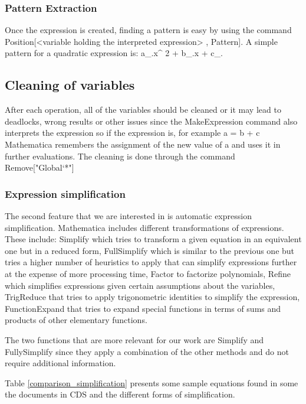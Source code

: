 \subsubsection{Pattern Extraction}
Once the expression is created, finding a pattern is easy by using the command {\codefont Position[<variable holding the interpreted expression> , Pattern]}. A simple pattern for a quadratic expression is: {\codefont a\_.x\^{} 2 + b\_.x + c\_.}

\subsection{Cleaning of variables}
After each operation, all of the variables should be cleaned or it may lead to deadlocks, wrong results or other issues since the {\codefont MakeExpression} command also interprets the expression so if the expression is, for example {\codefont a = b + c} Mathematica remembers the assignment of the new value of {\codefont a} and uses it in further evaluations. The cleaning is done through the command {\codefont Remove["Global`*"]}

\subsubsection{Expression simplification}
The second feature that we are interested in is automatic expression simplification.
Mathematica includes different transformations of expressions. These include: {\codefont Simplify} which tries to transform a given equation in an equivalent one but in a reduced form, {\codefont FullSimplify} which is similar to the previous one but tries a higher number of heuristics to apply that can simplify expressions further at the expense of more processing time, {\codefont Factor} to factorize polynomials, {\codefont Refine} which simplifies expressions given certain assumptions about the variables, {\codefont TrigReduce} that tries to apply trigonometric identities to simplify the expression, {\codefont FunctionExpand} that tries to expand special functions in terms of sums and products of other elementary functions. 

The two functions that are more relevant for our work are {\codefont Simplify} and {\codefont FullySimplify} since they apply a combination of the other methods and do not require additional information.

Table \ref{comparison_simplification} presents some sample equations found in some the documents in CDS and the different forms of simplification.

